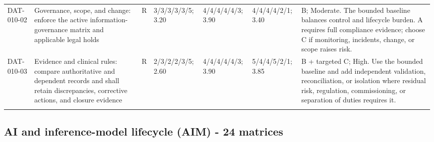 \documentclass[11pt,letterpaper]{article}
\begin{document}
\begin{scriptsize}
\begin{longtable}{@{}L{0.11\textwidth}L{0.165\textwidth}L{0.04\textwidth}L{0.115\textwidth}L{0.115\textwidth}L{0.115\textwidth}L{0.235\textwidth}@{}}
\addlinespace[2pt]
DAT-010-02 & Governance, scope, and change: enforce the active information-governance matrix and applicable legal holds & R & 3/3/3/3/3/5; 3.20 & 4/4/4/4/4/3; 3.90 & 4/4/4/4/2/1; 3.40 & B; Moderate. The bounded baseline balances control and lifecycle burden. A requires full compliance evidence; choose C if monitoring, incidents, change, or scope raises risk. \\
\addlinespace[2pt]
DAT-010-03 & Evidence and clinical rules: compare authoritative and dependent records and shall retain discrepancies, corrective actions, and closure evidence & R & 2/3/2/2/3/5; 2.60 & 4/4/4/4/4/3; 3.90 & 5/4/4/5/2/1; 3.85 & B + targeted C; High. Use the bounded baseline and add independent validation, reconciliation, or isolation where residual risk, regulation, commissioning, or separation of duties requires it. \\
\addlinespace[2pt]
\end{longtable}
\end{scriptsize}

\subsection{AI and inference-model lifecycle (AIM) - 24 matrices}
\end{document}
